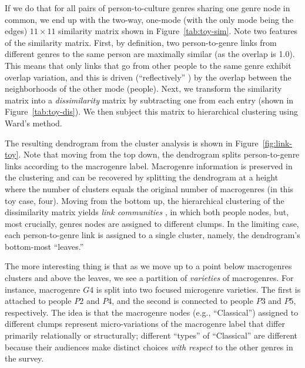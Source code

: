 \documentclass[a4paper,12pt]{article}
\begin{document}
If we do that for all pairs of person-to-culture genres sharing one genre node in common, we end up with the two-way, one-mode (with the only mode being the edges) $11 \times 11$ similarity matrix shown in Figure~\ref{tab:toy-sim}. Note two features of the similarity matrix. First, by definition, two person-to-genre links from different genres to the same person are maximally similar (as the overlap is 1.0). This means that only links that go from other people to the same genre exhibit overlap variation, and this is driven (``reflectively'' \citep{lizardo18}) by the overlap between the neighborhoods of the other mode (people). Next, we transform the similarity matrix into a {\em dissimilarity} matrix by subtracting one from each entry (shown in  Figure~\ref{tab:toy-dis}). We then subject this matrix to hierarchical clustering using Ward's \citeyearpar{ward63} method. 

The resulting dendrogram from the cluster analysis is shown in Figure~\ref{fig:link-toy}. Note that moving from the top down, the dendrogram splits person-to-genre links according to the macrogenre label. Macrogenre information is preserved in the clustering and can be recovered by splitting the dendrogram at a height where the number of clusters equals the original number of macrogenres (in this toy case, four). Moving from the bottom up, the hierarchical clustering of the dissimilarity matrix yields {\em link communities} \citep{ahn_etal10}, in which both people nodes, but, most crucially, genres nodes are assigned to different clumps. In the limiting case, each person-to-genre link is assigned to a single cluster, namely, the dendrogram's bottom-most ``leaves.'' 

The more interesting thing is that as we move up to a point below macrogenres clusters and above the leaves, we see a partition of {\em varieties} of macrogenres. For instance, macrogenre $G4$ is split into two focused microgenre varieties. The first is attached to people $P2$ and $P4$, and the second is connected to people $P3$ and $P5$, respectively. The idea is that the macrogenre nodes (e.g., ``Classical'') assigned to different clumps represent micro-variations of the macrogenre label that differ primarily relationally or structurally; different ``types'' of ``Classical'' are different because their audiences make distinct choices {\em with respect} to the other genres in the survey. 
\end{document}
